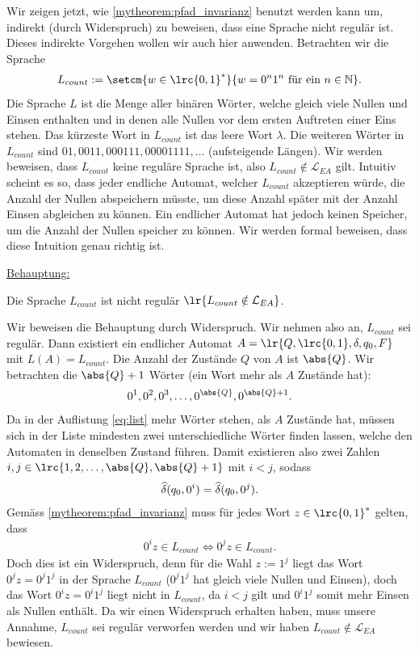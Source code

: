 Wir zeigen jetzt, wie \cref{mytheorem:pfad_invarianz} benutzt werden kann um, indirekt (durch Widerspruch) zu beweisen, dass eine Sprache nicht regulär ist. Dieses indirekte Vorgehen wollen wir auch hier anwenden. Betrachten wir die Sprache
\begin{align*}
	L_{count} := \setcm{w\in \lrc{0,1}^*}{w = 0^n 1^n\text{ für ein } n\in\mathbb{N}}.
\end{align*}
Die Sprache $L$ ist die Menge aller binären Wörter, welche gleich viele Nullen und Einsen enthalten und in denen alle Nullen vor dem ersten Auftreten einer Eins stehen. Das kürzeste Wort in $L_{count}$ ist das leere Wort $\lambda$. Die weiteren Wörter in $L_{count}$ sind $01, 0011, 000111, 00001111, \ldots $ (aufsteigende Längen). Wir werden beweisen, dass $L_{count}$ keine reguläre Sprache ist, also $L_{count}\notin \mathcal{L}_{EA}$ gilt. Intuitiv scheint es so, dass jeder endliche Automat, welcher $L_{count}$ akzeptieren würde, die Anzahl der Nullen abspeichern müsste, um diese Anzahl später mit der Anzahl Einsen abgleichen zu können. Ein endlicher Automat hat jedoch keinen Speicher, um die Anzahl der Nullen speicher zu können. Wir werden formal beweisen, dass diese Intuition genau richtig ist.

\underline{Behauptung:}

Die Sprache $L_{count}$ ist nicht regulär $\lr{L_{count}\notin \mathcal{L}_{EA}}$.

\begin{myproof}
	Wir beweisen die Behauptung durch Widerspruch. Wir nehmen also an, $L_{count}$ sei regulär. Dann existiert ein endlicher Automat $A = \lr{Q,\lrc{0,1}, \delta, q_0, F}$ mit $L(A) = L_{count}$. Die Anzahl der Zustände $Q$ von $A$ ist $\abs{Q}$. Wir betrachten die $\abs{Q}+1$ Wörter (ein Wort mehr als $A$ Zustände hat):
	\begin{align}\label{eq:list}
		0^1, 0^2, 0^3, \ldots , 0^{\abs{Q}}, 0^{\abs{Q}+1}.
	\end{align}
	Da in der Auflistung \cref{eq:list} mehr Wörter stehen, als $A$ Zustände hat, müssen sich in der Liste mindesten zwei unterschiedliche Wörter finden lassen, welche den Automaten in denselben Zustand führen. Damit existieren also zwei Zahlen $i,j\in\lrc{1,2,\ldots ,\abs{Q}, \abs{Q}+1}$ mit $i<j$, sodass
	\begin{align*}
		\widehat{\delta}(q_0,0^i) = \widehat{\delta}(q_0,0^j).
	\end{align*}
	Gemäss \cref{mytheorem:pfad_invarianz} muss für jedes Wort $z\in\lrc{0,1}^*$ gelten, dass
	\begin{align*}
		0^iz\in L_{count} \Longleftrightarrow 0^jz\in L_{count}.
	\end{align*}
	Doch dies ist ein Widerspruch, denn für die Wahl $z := 1^j$ liegt das Wort $0^jz = 0^j1^j$ in der Sprache $L_{count}$ ($0^j1^j$ hat gleich viele Nullen und Einsen), doch das Wort $0^iz = 0^i1^j$ liegt nicht in $L_{count}$, da $i<j$ gilt und $0^i1^j$ somit mehr Einsen als Nullen enthält. Da wir einen Widerspruch erhalten haben, muss unsere Annahme, $L_{count}$ sei regulär verworfen werden und wir haben $L_{count}\notin \mathcal{L}_{EA}$ bewiesen.
\end{myproof}

